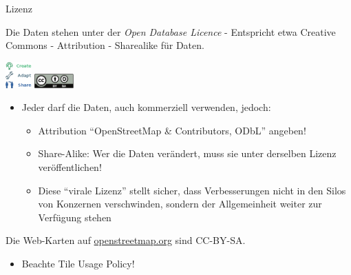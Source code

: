 \documentclass{beamer}
\begin{document}
\begin{frame}{Lizenz}

  Die Daten stehen unter der \emph{Open Database Licence} - Entspricht etwa Creative Commons - Attribution - Sharealike für Daten.

 \begin{center}
 \includegraphics[width=1cm]{ODbL.png}
 \hspace{2cm}
 \includegraphics[width=1.5cm]{cc-by-sa.pdf}
 \end{center}

\pause

\vspace*{-0.3cm}

\begin{itemize}
  \item Jeder darf die Daten, auch kommerziell verwenden, jedoch:
  \begin{itemize}
    \item Attribution "`OpenStreetMap \& Contributors, ODbL"' angeben!
    \item Share-Alike: Wer die Daten verändert, muss sie unter derselben Lizenz veröffentlichen!
    \item Diese "`virale Lizenz"' stellt sicher, dass Verbesserungen nicht in den Silos von Konzernen verschwinden, sondern der Allgemeinheit weiter zur Verfügung stehen
  \end{itemize}

\end{itemize}


\pause
Die Web-Karten auf \href{http://osm.org}{openstreetmap.org} sind CC-BY-SA.
\begin{itemize}
  \item Beachte Tile Usage Policy!
\end{itemize}


\end{frame}

%
%
%
%
%
\end{document}
